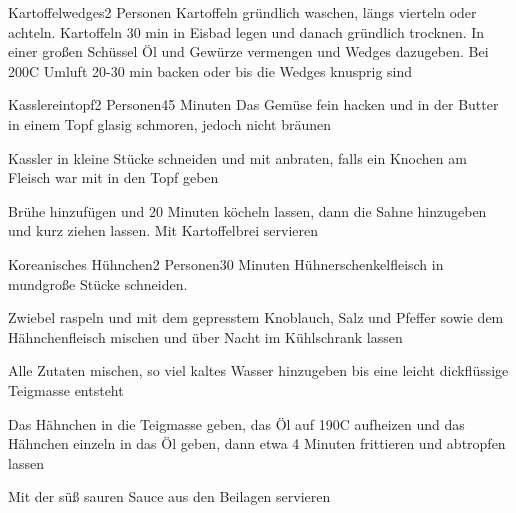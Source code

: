 
\begin{recipe}{Kartoffelwedges}{2 Personen}{}
Kartoffeln gründlich waschen, längs vierteln oder achteln.
Kartoffeln 30 min in Eisbad legen und danach gründlich trocknen.
In einer großen Schüssel Öl und Gewürze vermengen und Wedges dazugeben.
Bei 200\0C Umluft 20-30 min backen oder bis die Wedges knusprig sind
\end{recipe}


\begin{recipe}{Kasslereintopf}{2 Personen}{45 Minuten}
Das Gemüse fein hacken und in der Butter in einem Topf glasig schmoren, jedoch nicht bräunen

Kassler in kleine Stücke schneiden und mit anbraten, falls ein Knochen am Fleisch war mit in den Topf geben

Brühe hinzufügen und 20 Minuten köcheln lassen, dann die Sahne hinzugeben und kurz ziehen lassen.
Mit Kartoffelbrei servieren
\end{recipe}


\begin{recipe}{Koreanisches Hühnchen}{2 Personen}{30 Minuten}
Hühnerschenkelfleisch in mundgroße Stücke schneiden. 

Zwiebel raspeln und mit dem gepresstem Knoblauch, Salz und Pfeffer sowie dem Hähnchenfleisch mischen und über Nacht im Kühlschrank lassen


Alle Zutaten mischen, so viel kaltes Wasser hinzugeben bis eine leicht dickflüssige Teigmasse entsteht

Das Hähnchen in die Teigmasse geben, das Öl auf 190\0C aufheizen und das Hähnchen einzeln in das Öl geben, dann etwa 4 Minuten frittieren und abtropfen lassen

Mit der süß sauren Sauce aus den Beilagen servieren
\end{recipe}

